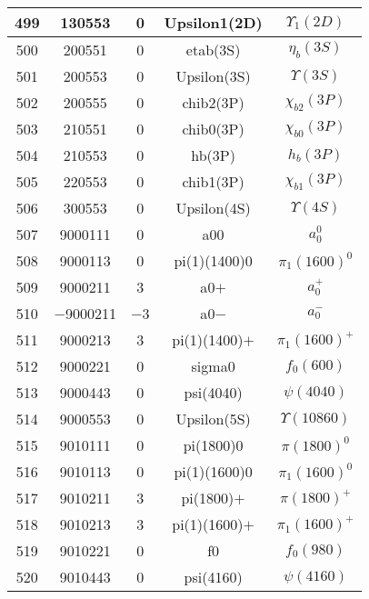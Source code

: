 \documentclass{article}
\begin{document}
\begin{table}[!htbp]
\begin{tabular}{|c|c|c|c|c|}
\hline
499 & 130553 & 0 & Upsilon\underline{\hspace{0.6em}}1(2D) & $\Upsilon_{1}(2D)$ \\
\hline
500 & 200551 & 0 & eta\underline{\hspace{0.6em}}b(3S) & $\eta_{b}(3S)$ \\
\hline
501 & 200553 & 0 & Upsilon(3S) & $\Upsilon(3S)$ \\
\hline
502 & 200555 & 0 & chi\underline{\hspace{0.6em}}b2(3P) & $\chi_{b2}(3P)$ \\
\hline
503 & 210551 & 0 & chi\underline{\hspace{0.6em}}b0(3P) & $\chi_{b0}(3P)$ \\
\hline
504 & 210553 & 0 & h\underline{\hspace{0.6em}}b(3P) & $h_{b}(3P)$ \\
\hline
505 & 220553 & 0 & chi\underline{\hspace{0.6em}}b1(3P) & $\chi_{b1}(3P)$ \\
\hline
506 & 300553 & 0 & Upsilon(4S) & $\Upsilon(4S)$ \\
\hline
507 & 9000111 & 0 & a\underline{\hspace{0.6em}}00 & $a_{0}^{0}$ \\
\hline
508 & 9000113 & 0 & pi(1)(1400)0 & $\pi_1(1600)^0$ \\
\hline
509 & 9000211 & 3 & a\underline{\hspace{0.6em}}0$+$ & $a_{0}^{+}$ \\
\hline
510 & $-$9000211 & $-$3 & a\underline{\hspace{0.6em}}0$-$ & $a_{0}^{-}$ \\
\hline
511 & 9000213 & 3 & pi(1)(1400)$+$ & $\pi_1(1600)^+$ \\
\hline
512 & 9000221 & 0 & sigma\underline{\hspace{0.6em}}0 & $f_{0}(600)$ \\
\hline
513 & 9000443 & 0 & psi(4040) & $\psi(4040)$ \\
\hline
514 & 9000553 & 0 & Upsilon(5S) & $\Upsilon(10860)$ \\
\hline
515 & 9010111 & 0 & pi(1800)0 & $\pi(1800)^{0}$ \\
\hline
516 & 9010113 & 0 & pi(1)(1600)0 & $\pi_{1}(1600)^{0}$ \\
\hline
517 & 9010211 & 3 & pi(1800)$+$ & $\pi(1800)^{+}$ \\
\hline
518 & 9010213 & 3 & pi(1)(1600)$+$ & $\pi_{1}(1600)^{+}$ \\
\hline
519 & 9010221 & 0 & f\underline{\hspace{0.6em}}0 & $f_{0}(980)$ \\
\hline
520 & 9010443 & 0 & psi(4160) & $\psi(4160)$ \\
\hline
\end{tabular}
\end{table}
\end{document}
